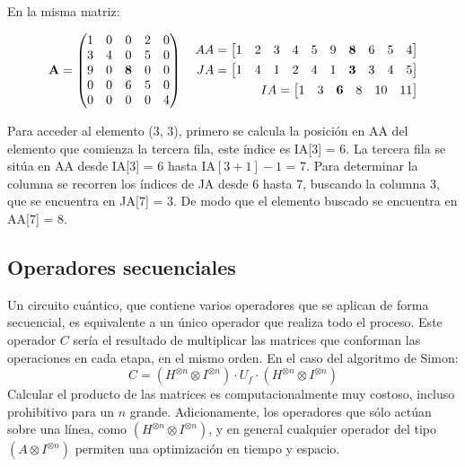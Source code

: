 \begin{ejemplo} En la misma matriz:

$$ \textbf{A} = \begin{pmatrix} 
	1 & 0 & 0 & 2 & 0 \\
	3 & 4 & 0 & 5 & 0 \\
	9 & 0 & \textbf{8} & 0 & 0 \\
	0 & 0 & 6 & 5 & 0 \\
	0 & 0 & 0 & 0 & 4  \end{pmatrix}
\quad
\begin{aligned}
	AA = \begin{bmatrix}  1 & 2 & 3 & 4 & 5  & 9 & \textbf{8} & 6 & 5 & 4 \end{bmatrix} \\
	JA = \begin{bmatrix}  1 & 4 & 1 & 2 & 4  & 1 & \textbf{3} & 3 & 4 & 5 \end{bmatrix}\\
	IA = \begin{bmatrix}  1 & 3 & \textbf{6} & 8 & 10 & 11 \end{bmatrix}
\end{aligned}
$$

Para acceder al elemento (3, 3), primero se calcula la posición en AA del 
elemento que comienza la tercera fila, este índice es IA[3] = 6. La tercera fila 
se sitúa en AA desde IA[3] = 6 hasta IA$[3+1]-1$ = 7.  Para determinar la 
columna se recorren los índices de JA desde 6 hasta 7, buscando la columna 3, 
que se encuentra en JA[7] = 3. De modo que el elemento buscado se encuentra en 
AA[7] = 8.

\subsection{Operadores secuenciales}
Un circuito cuántico, que contiene varios operadores que se aplican de forma 
secuencial, es equivalente a un único operador que realiza todo el proceso. Este 
operador $C$ sería el resultado de multiplicar las matrices que conforman las 
operaciones en cada etapa, en el mismo orden. En el caso del algoritmo de Simon:
%
$$ C = (H^{\otimes n} \otimes I^{\otimes n}) \cdot U_f \cdot (H^{\otimes n} 
\otimes I^{\otimes n})$$
%
Calcular el producto de las matrices es computacionalmente muy costoso, incluso 
prohibitivo para un $n$ grande. Adicionamente, los operadores que sólo actúan 
sobre una línea, como $(H^{\otimes n} \otimes I^{\otimes n})$, y en general 
cualquier operador del tipo $(A \otimes I^{\otimes n})$ permiten una 
optimización en tiempo y espacio.


\end{ejemplo}
